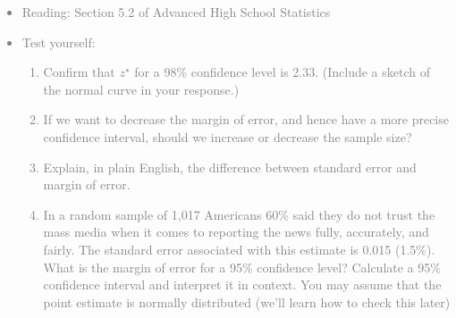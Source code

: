 \documentclass[11pt]{article}
\newcommand{\gray}[1]{\textcolor{gray}{#1}}
\begin{document}
\gray{
{\it
\vspace{-0.5cm}
\begin{itemize}
\renewcommand{\labelitemi}{{\textcolor{dark}{$\ast$}}}
\item Reading: Section 5.2 of Advanced High School Statistics
\item Test yourself: 
{\small
\begin{enumerate}
\item Confirm that $z^{\star}$ for a 98\% confidence level is 2.33. (Include a sketch of the normal curve in your response.)
\item If we want to decrease the margin of error, and hence have a more precise confidence interval, should we increase or decrease the sample size?
\item Explain, in plain English, the difference between standard error and margin of error.
\item In a random sample of 1,017 Americans 60\% said they do not trust the mass media when it comes to reporting the news fully, accurately, and fairly. The standard error associated with this estimate is 0.015 (1.5\%). What is the margin of error for a 95\% confidence level? Calculate a 95\% confidence interval and interpret it in context. You may assume that the point estimate is normally distributed (we'll learn how to check this later)

\end{enumerate}}
\end{itemize}}}
\end{document}
